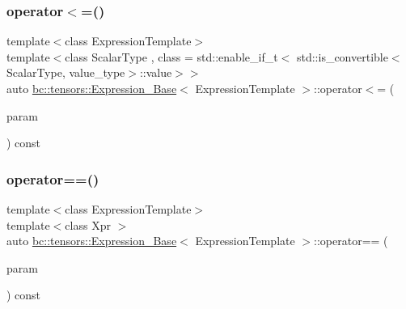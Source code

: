 \subsubsection{\texorpdfstring{operator$<$=()}{operator<=()}\hspace{0.1cm}{\footnotesize\ttfamily [2/2]}}
{\footnotesize\ttfamily template$<$class Expression\+Template$>$ \\
template$<$class Scalar\+Type , class  = std\+::enable\+\_\+if\+\_\+t$<$   std\+::is\+\_\+convertible$<$\+Scalar\+Type, value\+\_\+type$>$\+::value$>$$>$ \\
auto \hyperlink{classbc_1_1tensors_1_1Expression__Base}{bc\+::tensors\+::\+Expression\+\_\+\+Base}$<$ Expression\+Template $>$\+::operator$<$= (\begin{DoxyParamCaption}\item[{const Scalar\+Type \&}]{param }\end{DoxyParamCaption}) const\hspace{0.3cm}{\ttfamily [inline]}}

\mbox{\label{classbc_1_1tensors_1_1Expression__Base_a72826942e66345ca8dbf50e892b2743b}} 
\subsubsection{\texorpdfstring{operator==()}{operator==()}\hspace{0.1cm}{\footnotesize\ttfamily [1/2]}}
{\footnotesize\ttfamily template$<$class Expression\+Template$>$ \\
template$<$class Xpr $>$ \\
auto \hyperlink{classbc_1_1tensors_1_1Expression__Base}{bc\+::tensors\+::\+Expression\+\_\+\+Base}$<$ Expression\+Template $>$\+::operator== (\begin{DoxyParamCaption}\item[{const \hyperlink{classbc_1_1tensors_1_1Expression__Base}{Expression\+\_\+\+Base}$<$ Xpr $>$ \&}]{param }\end{DoxyParamCaption}) const\hspace{0.3cm}{\ttfamily [inline]}}

\mbox{\label{classbc_1_1tensors_1_1Expression__Base_ad532a22ae94a81d39e6f33f21745dacb}} 
